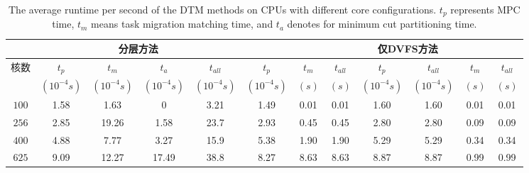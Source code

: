   \begin{table}
\tabcolsep=2pt
 \caption{The average runtime per second of the DTM methods on CPUs with
   different core configurations. $t_p$ represents MPC time, 
$t_m$ means task migration matching time, and $t_a$  denotes for minimum cut partitioning time.\label{tab:time}}{
 \begin{tabular}{|c|c|c|c|c|c|c|c|c|c|c|c|}
 \hline
	        & \multicolumn{4}{c|}{分层方法} & \multicolumn{3}{c|}{\cite{MaWang:APCCAS'14}} & \multicolumn{2}{c|}{仅DVFS方法}& \multicolumn{2}{c|}{\cite{Hanumaiah:TCAD'11}} \\
 \hline
核数	& $t_p$ & $t_m$ &$t_a$ &
$t_{all}$ & $t_p$ & $t_m$ &$t_{all}$  &
$t_p$ &$t_{all}$ & $t_{m}$ &$t_{all}$\\
                               &   $(10^{-4}s)$ & $(10^{-4}s)$ &
                               $(10^{-4}s)$ & $(10^{-4}s)$ & $(10^{-4}s)$
                               &   $(s)$  & $(s)$  & $(10^{-4}s)$ & $(10^{-4}s)$ &   $(s)$  & $(s)$\\
 \hline 
 \hline
$100$ & 1.58 & 1.63  & 0     & 3.21 & 1.49 & 0.01 & 0.01 & 1.60 & 1.60 & 0.01 & 0.01\\
 \hline
$256$ & 2.85 & 19.26 & 1.58  & 23.7 & 2.93 & 0.45 & 0.45 & 2.80 & 2.80 & 0.09 & 0.09\\
 \hline
$400$ & 4.88 & 7.77  & 3.27  & 15.9 & 5.38 & 1.90 & 1.90 & 5.29 & 5.29 & 0.34 & 0.34\\
 \hline
$625$ & 9.09 & 12.27 & 17.49 & 38.8 & 8.27 & 8.63 & 8.63 & 8.87 & 8.87 & 0.99 & 0.99\\
 \hline
 \hline
 \end{tabular}}
 \end{table}




























